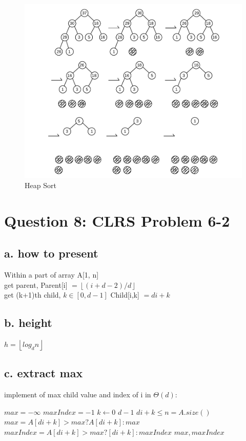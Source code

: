 \documentclass[]{article}
\begin{document}
\begin{figure}
	\centering
	\includegraphics[width=0.9\linewidth]{2_heap_sort}
	\caption{Heap Sort}
	\label{fig:2hs}
\end{figure}

\section{Question 8: CLRS Problem 6-2}
\subsection{a. how to present}
Within a part of array A[1, n]\\
get parent, Parent[i] $ = \left \lfloor (i+d-2)/d \right \rfloor$\\
get (k+1)th child, $k \in [0, d-1]$ Child[i,k] $= di + k$\\

\subsection{b. height}
$h = \left \lfloor log_{d}n \right \rfloor $

\subsection{c. extract max}

implement of max child value and index of i in $\Theta(d)$:\\
\begin{codebox}

	\li $max = -\infty$
	\li $maxIndex = -1$
	\li \For $k \gets 0$ \To $d-1$
	\li 	\Do  \If $di+k \le n=A.size()$
	\li 	\Then $max = A[di + k]>max?A[di+k]:max$
	\li			 $maxIndex =  A[di + k]>max?[di+k]:maxIndex$
	\End
	\End
	\li \Return $max, maxIndex$

\end{codebox}
\end{document}
